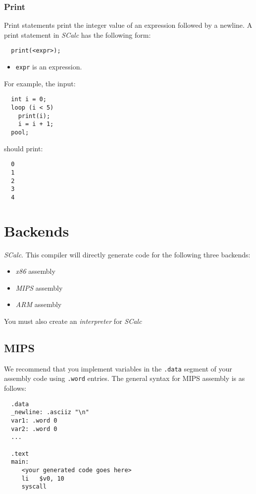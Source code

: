 \documentclass{article}
\newcommand{\code}[1]{\texttt{\textmd{#1}}}
\begin{document}
\subsubsection{Print}
\label{sssec:print}
Print statements print the integer value of an expression followed by a newline. A print statement
in \textit{SCalc} has the following form:
\begin{lstlisting}
  print(<expr>);
\end{lstlisting}

\begin{itemize}
  \item \code{expr} is an expression.
\end{itemize}

For example, the input:
\begin{lstlisting}
  int i = 0;
  loop (i < 5)
    print(i);
    i = i + 1;
  pool;
\end{lstlisting}
should print:
\begin{lstlisting}
  0
  1
  2
  3
  4
\end{lstlisting}

\section{Backends}

\textit{SCalc}. This compiler will directly generate code for the following three backends:
\begin {itemize}
  \item \textit{x86} assembly
  \item \textit{MIPS} assembly
  \item \textit{ARM} assembly
\end {itemize}
You must also create an \textit{interpreter} for \textit{SCalc}

\subsection{MIPS}
We recommend that you implement variables in the \code{.data} segment of your assembly code using \code{.word} entries. The
general syntax for MIPS assembly is as follows:

\begin{lstlisting}
  .data
  _newline: .asciiz "\n"
  var1: .word 0
  var2: .word 0
  ...

  .text
  main:
     <your generated code goes here>
     li   $v0, 10
     syscall
\end{lstlisting}
\end{document}
